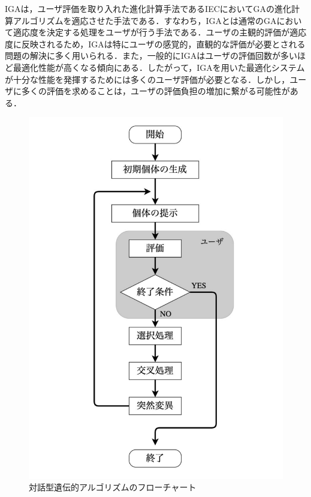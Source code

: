 IGAは，ユーザ評価を取り入れた進化計算手法であるIECにおいてGAの進化計算アルゴリズムを適応させた手法である．すなわち，IGAとは通常のGAにおいて適応度を決定する処理をユーザが行う手法である．ユーザの主観的評価が適応度に反映されるため，IGAは特にユーザの感覚的，直観的な評価が必要とされる問題の解決に多く用いられる．また，一般的にIGAはユーザの評価回数が多いほど最適化性能が高くなる傾向にある．したがって，IGAを用いた最適化システムが十分な性能を発揮するためには多くのユーザ評価が必要となる．しかし，ユーザに多くの評価を求めることは，ユーザの評価負担の増加に繋がる可能性がある．

\begin{figure}[p]
\begin{center}

\vspace{1.5cm}
\includegraphics[scale=0.45]{figurefolder/chapter2/IGaFlowchart.pdf}
\caption{対話型遺伝的アルゴリズムのフローチャート}
\label{対話型遺伝的アルゴリズムのフローチャート}

\end{center}
\end{figure}




